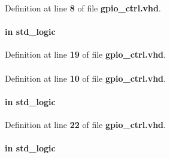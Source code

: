 Definition at line {\bf 8} of file {\bf gpio\+\_\+ctrl.\+vhd}.

\paragraph[{mux\+\_\+sel}]{ {\bfseries \textcolor{keywordflow}{in}\textcolor{vhdlchar}{ }} {\bfseries \textcolor{comment}{std\+\_\+logic}\textcolor{vhdlchar}{ }} \hspace{0.3cm}{\ttfamily [Port]}}\label{classgpio__ctrl_a814c3f03bc84b0d7e34d2db86a250bc0}


Definition at line {\bf 19} of file {\bf gpio\+\_\+ctrl.\+vhd}.

\paragraph[{numeric\+\_\+std}]{\hspace{0.3cm}{\ttfamily [Package]}}\label{classgpio__ctrl_a2edc34402b573437d5f25fa90ba4013e}


Definition at line {\bf 10} of file {\bf gpio\+\_\+ctrl.\+vhd}.

\paragraph[{out\+\_\+val\+\_\+0}]{ {\bfseries \textcolor{keywordflow}{in}\textcolor{vhdlchar}{ }} {\bfseries \textcolor{comment}{std\+\_\+logic}\textcolor{vhdlchar}{ }} \hspace{0.3cm}{\ttfamily [Port]}}\label{classgpio__ctrl_af6049a411019f7a39f09710e0cd5b795}


Definition at line {\bf 22} of file {\bf gpio\+\_\+ctrl.\+vhd}.

\paragraph[{out\+\_\+val\+\_\+1}]{ {\bfseries \textcolor{keywordflow}{in}\textcolor{vhdlchar}{ }} {\bfseries \textcolor{comment}{std\+\_\+logic}\textcolor{vhdlchar}{ }} \hspace{0.3cm}{\ttfamily [Port]}}\label{classgpio__ctrl_a6c64ef0e00025bf1371e171a03fbf73a}



